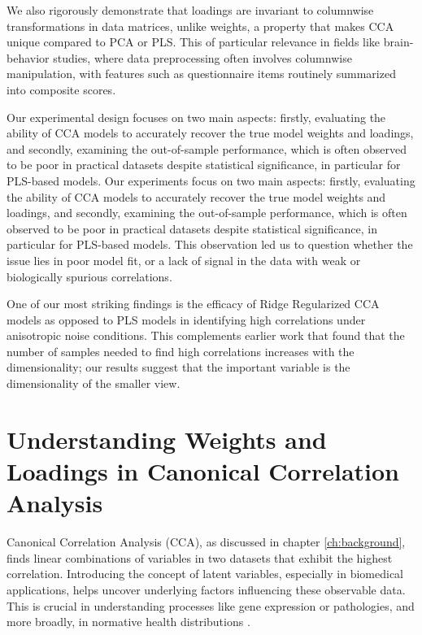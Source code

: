 We also rigorously demonstrate that loadings are invariant to columnwise transformations in data matrices, unlike weights, a property that makes CCA unique compared to PCA or PLS.
This of particular relevance in fields like brain-behavior studies, where data preprocessing often involves columnwise manipulation, with features such as questionnaire items routinely summarized into composite scores.

Our experimental design focuses on two main aspects: firstly, evaluating the ability of CCA models to accurately recover the true model weights and loadings, and secondly, examining the out-of-sample performance, which is often observed to be poor in practical datasets despite statistical significance, in particular for PLS-based models.
Our experiments focus on two main aspects: firstly, evaluating the ability of CCA models to accurately recover the true model weights and loadings, and secondly, examining the out-of-sample performance, which is often observed to be poor in practical datasets despite statistical significance, in particular for PLS-based models.
This observation led us to question whether the issue lies in poor model fit, or a lack of signal in the data with weak or biologically spurious correlations.

One of our most striking findings is the efficacy of Ridge Regularized CCA models as opposed to PLS models in identifying high correlations under anisotropic noise conditions.
This complements earlier work \citep{helmer2020stability} that found that the number of samples needed to find high correlations increases with the dimensionality; our results suggest that the important variable is the dimensionality of the smaller view.

\section{Understanding Weights and Loadings in Canonical Correlation Analysis}

Canonical Correlation Analysis (CCA), as discussed in chapter \ref{ch:background}, finds linear combinations of variables in two datasets that exhibit the highest correlation.
Introducing the concept of latent variables, especially in biomedical applications, helps uncover underlying factors influencing these observable data.
This is crucial in understanding processes like gene expression or pathologies, and more broadly, in normative health distributions \citep{lawry2023multi}.

